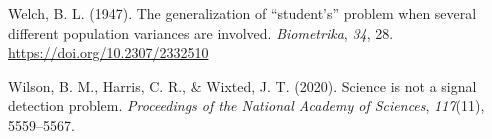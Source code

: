 \documentclass[
  man,floatsintext]{apa7}
\newlength{\cslhangindent}
\newlength{\cslentryspacingunit} %
\newenvironment{CSLReferences}[2] %
 {%
  \setlength{\parindent}{0pt}
  \ifodd #1
  \let\oldpar\par
  \def\par{\hangindent=\cslhangindent\oldpar}
  \fi
  \setlength{\parskip}{#2\cslentryspacingunit}
 }%
 {}
\begin{document}
\begin{CSLReferences}{1}{0}
\leavevmode{}%
Welch, B. L. (1947). The generalization of {``student's''} problem when several different population variances are involved. \emph{Biometrika}, \emph{34}, 28. \url{https://doi.org/10.2307/2332510}

\leavevmode{}%
Wilson, B. M., Harris, C. R., \& Wixted, J. T. (2020). Science is not a signal detection problem. \emph{Proceedings of the National Academy of Sciences}, \emph{117}(11), 5559--5567.

\end{CSLReferences}
\end{document}
